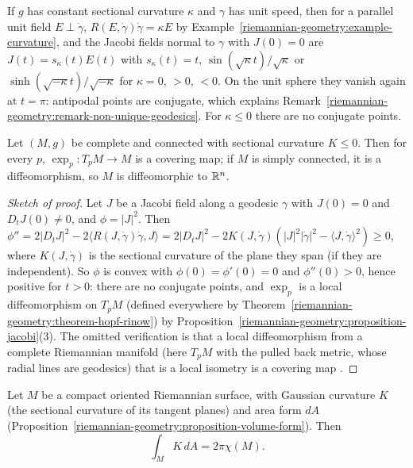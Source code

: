 \begin{example}\label{riemannian-geometry:example-jacobi-constant}
If $g$ has constant sectional curvature $\kappa$ and $\gamma$ has unit speed, then for a parallel unit field $E \perp \dot\gamma$, $R(E, \dot\gamma)\dot\gamma = \kappa E$ by Example~\ref{riemannian-geometry:example-curvature}, and the Jacobi fields
normal to $\gamma$ with $J(0) = 0$ are $J(t) = s_\kappa(t)E(t)$ with $s_\kappa(t) = t$, $\sin(\sqrt\kappa t)/\sqrt\kappa$ or $\sinh(\sqrt{-\kappa}t)/\sqrt{-\kappa}$ for $\kappa = 0$, $> 0$, $< 0$. On the unit sphere they vanish again at $t = \pi$: antipodal
points are conjugate, which explains Remark~\ref{riemannian-geometry:remark-non-unique-geodesics}. For $\kappa \leq 0$ there are no conjugate points.
\end{example}

\begin{theorem}\label{riemannian-geometry:theorem-cartan-hadamard}
Let $(M, g)$ be complete and connected with sectional curvature $K \leq 0$. Then for every $p$, $\exp_p \colon T_pM \to M$ is a covering map; if $M$ is simply connected, it is a diffeomorphism, so $M$ is diffeomorphic to $\mathbb{R}^n$.
\end{theorem}

\begin{proof}[Sketch of proof]
Let $J$ be a Jacobi field along a geodesic $\gamma$ with $J(0) = 0$ and $D_tJ(0) \neq 0$, and $\phi = |J|^2$. Then
$\phi'' = 2|D_tJ|^2 - 2\langle R(J, \dot\gamma)\dot\gamma, J\rangle = 2|D_tJ|^2 - 2K(J, \dot\gamma)(|J|^2|\dot\gamma|^2 - \langle J, \dot\gamma\rangle^2) \geq 0$, where $K(J, \dot\gamma)$ is the sectional curvature of the plane they span (if they are
independent). So $\phi$ is convex with $\phi(0) = \phi'(0) = 0$ and $\phi''(0) > 0$, hence positive for $t > 0$: there are no conjugate points, and $\exp_p$ is a local diffeomorphism on $T_pM$ (defined everywhere by
Theorem~\ref{riemannian-geometry:theorem-hopf-rinow}) by Proposition~\ref{riemannian-geometry:proposition-jacobi}(3). The omitted verification is that a local diffeomorphism from a complete Riemannian manifold (here $T_pM$ with the
pulled back metric, whose radial lines are geodesics) that is a local isometry is a covering map \cite[Chapter 7]{do-carmo-riemannian}.
\end{proof}

\begin{theorem}\label{riemannian-geometry:theorem-gauss-bonnet}
Let $M$ be a compact oriented Riemannian surface, with Gaussian curvature $K$ (the sectional curvature of its tangent planes) and area form $dA$
(Proposition~\ref{riemannian-geometry:proposition-volume-form}). Then
\[
\int_MK\,dA = 2\pi\chi(M) .
\]
\end{theorem}

